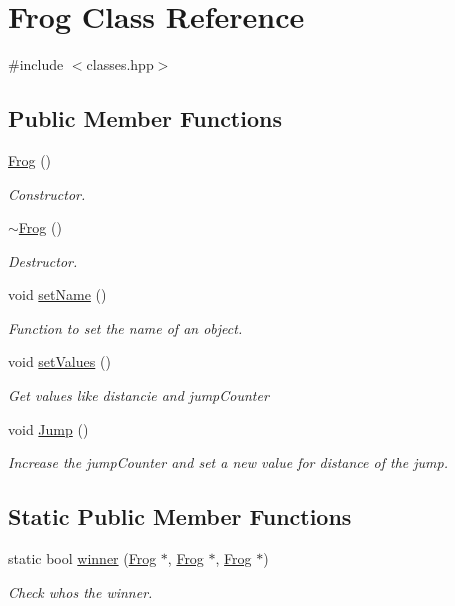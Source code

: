 \hypertarget{classFrog}{}\section{Frog Class Reference}
\label{classFrog}


{\ttfamily \#include $<$classes.\+hpp$>$}

\subsection*{Public Member Functions}
\begin{DoxyCompactItemize}
\item 
\hyperlink{classFrog_aca8f9a0c2bf409f2a0f876289881ede1}{Frog} ()
\begin{DoxyCompactList}\small\item\em Constructor. \end{DoxyCompactList}\item 
\hyperlink{classFrog_a03c9cd2a028e2466a3bfe5e9af1c12e7}{$\sim$\+Frog} ()
\begin{DoxyCompactList}\small\item\em Destructor. \end{DoxyCompactList}\item 
void \hyperlink{classFrog_acb8b91f14a39f0f990e3230dc13d2c6e}{set\+Name} ()
\begin{DoxyCompactList}\small\item\em Function to set the name of an object. \end{DoxyCompactList}\item 
void \hyperlink{classFrog_a1bc86cc74948b27d2948d90f16f2b111}{set\+Values} ()
\begin{DoxyCompactList}\small\item\em Get values like {\itshape distancie} and {\itshape jump\+Counter} \end{DoxyCompactList}\item 
void \hyperlink{classFrog_a7c7e8548354eb48bf7b7f9986e9b100c}{Jump} ()
\begin{DoxyCompactList}\small\item\em Increase the jump\+Counter and set a new value for distance of the jump. \end{DoxyCompactList}\end{DoxyCompactItemize}
\subsection*{Static Public Member Functions}
\begin{DoxyCompactItemize}
\item 
static bool \hyperlink{classFrog_aefca49315bbf86bf6c23e71143f43ef3}{winner} (\hyperlink{classFrog}{Frog} $\ast$, \hyperlink{classFrog}{Frog} $\ast$, \hyperlink{classFrog}{Frog} $\ast$)
\begin{DoxyCompactList}\small\item\em Check who\textquotesingle{}s the winner. \end{DoxyCompactList}\end{DoxyCompactItemize}
